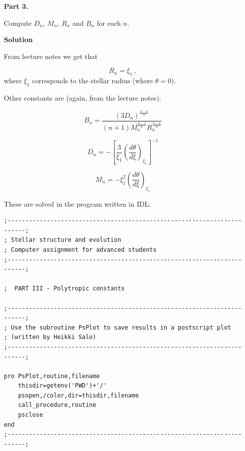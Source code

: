 \documentclass[a4paper,12pt]{article}
\begin{document}
\begin{itemize}


\newpage
\item[\textbf{Part 3.}]

Compute $D_n$, $M_n$, $R_n$ and $B_n$ for each $n$.

\vspace{0.5cm}
\textbf{Solution}

From lecture notes we get that

\begin{equation}
R_n=\xi_1 \, ,
\end{equation}
where $\xi_1$ corresponds to the stellar radius (where $\theta = 0$).

Other constants are (again, from the lecture notes):

\begin{equation}
B_n = \frac{(3 D_n)^{\frac{3-n}{n}}}{(n+1) M_n^{\frac{n-1}{n}} R_n^{\frac{3-n}{n}}}
\end{equation}

\begin{equation}
D_n=-\left[\frac{3}{\xi_1} \left(\frac{d\theta}{d\xi}\right)_{\xi_1} \right]^{-1}
\end{equation}

\begin{equation}
M_n = -\xi_1^2 \left(\frac{d\theta}{d\xi}\right)_{\xi_1}
\end{equation}

These are solved in the program written in IDL:

\begin{scriptsize}
\begin{verbatim}
;------------------------------------------------------------------------;
; Stellar structure and evolution
; Computer assignment for advanced students
;------------------------------------------------------------------------;

;  PART III - Polytropic constants

;------------------------------------------------------------------------;
; Use the subroutine PsPlot to save results in a postscript plot 
; (written by Heikki Salo)
;------------------------------------------------------------------------;

pro PsPlot,routine,filename
	thisdir=getenv('PWD')+'/'
	psopen,/color,dir=thisdir,filename
	call_procedure,routine
	psclose		
end
;------------------------------------------------------------------------;


\end{verbatim}
\end{scriptsize}
\end{itemize}
\end{document}
